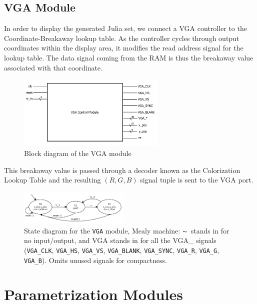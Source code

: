 \documentclass{article}
\begin{document}
\subsection{VGA Module}

In order to display the generated Julia set, we connect a VGA
controller to the Coordinate-Breakaway lookup table. As the controller
cycles through output coordinates within the display area, it modifies
the read address signal for the lookup table. The data signal coming
from the RAM is thus the breakaway value associated with that
coordinate.

\begin{figure}[H]
  \centering \includegraphics[width=200pt]{block_diagrams/vga.pdf}
  \caption{Block diagram of the VGA module}
\end{figure}

This breakaway value is passed through a decoder known as the
Colorization Lookup Table and the resulting $(R, G, B)$ signal tuple
is sent to the VGA port.



\begin{figure}[H]
  \centering \includegraphics[width=200px]{state_diagrams/vga.pdf}
  \caption{State diagram for the \texttt{VGA} module, Mealy machine:
    $\thicksim$ stands in for no input/output, and VGA stands in for
    all the VGA\_ signals (\texttt{VGA\_CLK}, \texttt{VGA\_HS},
    \texttt{VGA\_VS}, \texttt{VGA\_BLANK}, \texttt{VGA\_SYNC},
    \texttt{VGA\_R}, \texttt{VGA\_G}, \texttt{VGA\_B}). Omits unused
    signals for compactness.}
\end{figure}


\section{Parametrization Modules}
\end{document}
